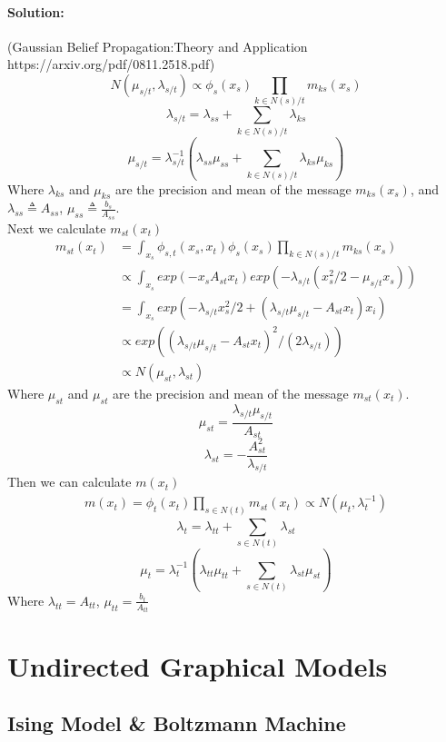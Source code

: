 \documentclass[twoside]{article}
\begin{document}
\begin{itemize}
\paragraph{Solution:}(Gaussian Belief Propagation:Theory and Application https://arxiv.org/pdf/0811.2518.pdf)\\
$$N(\mu_{s/t},\lambda_{s/t})\propto \phi_s(x_s)\prod_{k\in N(s)/t}m_{ks}(x_s)$$
$$\lambda_{s/t}=\lambda_{ss}+\sum_{k\in N(s)/t}\lambda_{ks}$$
$$\mu_{s/t}=\lambda_{s/t}^{-1}(\lambda_{ss}\mu_{ss} +\sum_{k\in N(s)/t}\lambda_{ks}\mu_{ks}) $$
Where $\lambda_{ks}$ and $\mu_{ks}$ are the precision and mean of the message $m_{ks}(x_s)$, and $\lambda_{ss}\triangleq A_{ss}$, $\mu_{ss}\triangleq\frac{b_s}{A_{ss}}$.\\
Next we calculate $m_{st}(x_t)$
\begin{align*}
m_{st}(x_t)&=\int_{x_s} \phi_{s,t}(x_s,x_t)\phi_s(x_s)\prod_{k\in N(s)/t}m_{ks}(x_s)\\
&\propto \int_{x_s} exp(-x_sA_{st}x_t)exp(-\lambda_{s/t}(x_s^2/2-\mu_{s/t}x_s))\\
&= \int_{x_s} exp(-\lambda_{s/t}x_s^2/2 +(\lambda_{s/t}\mu_{s/t}-A_{st}x_t)x_i )\\
&\propto exp((\lambda_{s/t}\mu_{s/t}-A_{st}x_t)^2/(2\lambda_{s/t}))\\
&\propto N(\mu_{st}, \lambda_{st})
\end{align*}
Where $\mu_{st}$ and $\mu_{st}$ are the precision and mean of the message $m_{st}(x_t)$.
$$\mu_{st} = \frac{\lambda_{s/t}\mu_{s/t}}{A_{st}} $$
$$\lambda_{st}=-\frac{A_{st}^2}{\lambda_{s/t}}$$
Then we can calculate $m(x_t)$
\begin{align*}
m(x_t)=\phi_t(x_t)\prod_{s\in N(t)}m_{st}(x_t)\propto N(\mu_t, \lambda_t^{-1})
\end{align*}
$$\lambda_t = \lambda_{tt} + \sum_{s\in N(t)} \lambda_{st}$$
$$\mu_t = \lambda_t^{-1}(\lambda_{tt}\mu_{tt}+\sum_{s\in N(t)}\lambda_{st}\mu_{st})$$
Where $\lambda_{tt} = A_{tt}$, $\mu_{tt}=\frac{b_t}{A_{tt}}$
\end{itemize}






\newpage
\section{Undirected Graphical Models}
\subsection{Ising Model \& Boltzmann Machine}
\end{document}
